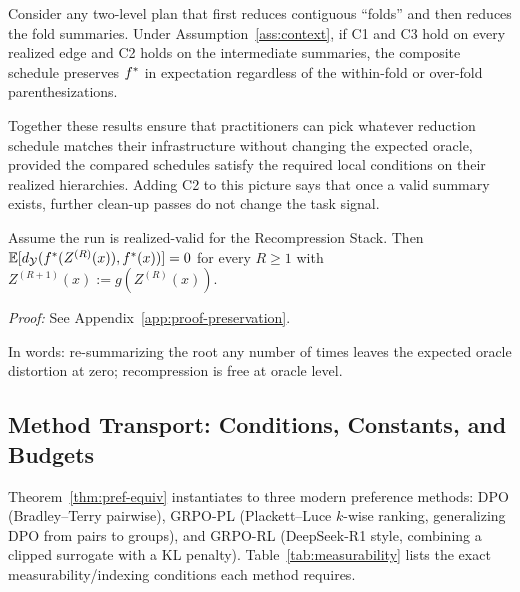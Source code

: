 \begin{corollary}\label{cor:folds}
Consider any two-level plan that first reduces contiguous ``folds'' and then reduces the fold summaries. Under Assumption~\ref{ass:context}, if C1 and C3 hold on every realized edge and C2 holds on the intermediate summaries, the composite schedule preserves $f^\ast$ in expectation regardless of the within-fold or over-fold parenthesizations.
\end{corollary}

Together these results ensure that practitioners can pick whatever reduction schedule matches their infrastructure without changing the expected oracle, provided the compared schedules satisfy the required local conditions on their realized hierarchies. Adding C2 to this picture says that once a valid summary exists, further clean-up passes do not change the task signal.

\begin{theorem}\label{thm:multi-round}
Assume the run is realized-valid for the Recompression Stack. Then $\mathbb{E}[d_{\mathcal{Y}}(f^\ast(Z^{(R)}(x)), f^\ast(x))] = 0$ for every $R \geq 1$ with $Z^{(R+1)}(x) := g(Z^{(R)}(x))$.
\end{theorem}

\noindent\textit{Proof:} See Appendix~\ref{app:proof-preservation}.

\noindent In words: re-summarizing the root any number of times leaves the expected oracle distortion at zero; recompression is free at oracle level.

\subsection{Method Transport: Conditions, Constants, and Budgets}\label{app:method-transport}

Theorem~\ref{thm:pref-equiv} instantiates to three modern preference
methods: DPO (Bradley--Terry pairwise), GRPO-PL (Plackett--Luce
$k$-wise ranking, generalizing DPO from pairs to groups), and GRPO-RL
(DeepSeek-R1 style, combining a clipped surrogate with a KL penalty).
Table~\ref{tab:measurability} lists the exact measurability/indexing
conditions each method requires.

